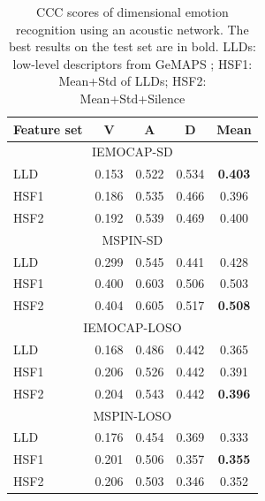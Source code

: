 \begin{table}[htpb]
\caption{CCC scores of dimensional emotion recognition using an acoustic
network. The best results on the test set are in bold. LLDs: low-level
descriptors from GeMAPS \cite{Eyben}; HSF1: Mean+Std of LLDs; HSF2: Mean+Std+Silence}
 \begin{center}
 \label{tab:ser-test}
 \begin{tabular}{l c c c c}
 \hline
Feature set & V & A & D & Mean \\
\hline \hline
\multicolumn{5}{c}{IEMOCAP-SD} \\
LLD    & 0.153 & 0.522 & 0.534 & \textbf{0.403} \\ 
HSF1   & 0.186 & 0.535 & 0.466 & 0.396 \\
HSF2   & 0.192 & 0.539 & 0.469 & 0.400 \\
 \hline
\multicolumn{5}{c}{MSPIN-SD} \\ 
LLD    & 0.299 & 0.545 & 0.441 & 0.428 \\
HSF1    & 0.400 & 0.603 & 0.506 & 0.503 \\
HSF2    & 0.404 & 0.605 & 0.517 & \textbf{0.508} \\
 \hline
\multicolumn{5}{c}{IEMOCAP-LOSO} \\
LLD    & 0.168 & 0.486 & 0.442 & 0.365 \\
HSF1   & 0.206 & 0.526 & 0.442 & 0.391 \\
HSF2   & 0.204 & 0.543 & 0.442 & \textbf{0.396} \\ 
 \hline
\multicolumn{5}{c}{MSPIN-LOSO} \\
LLD     & 0.176 & 0.454 & 0.369 & 0.333 \\ 
HSF1    & 0.201 & 0.506 & 0.357 & \textbf{0.355} \\
HSF2    & 0.206 & 0.503 & 0.346 & 0.352 \\
 \hline
 \end{tabular}
\end{center}
\end{table} 

